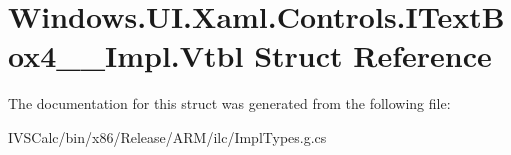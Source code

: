 \hypertarget{struct_windows_1_1_u_i_1_1_xaml_1_1_controls_1_1_i_text_box4_____impl_1_1_vtbl}{}\section{Windows.\+U\+I.\+Xaml.\+Controls.\+I\+Text\+Box4\+\_\+\+\_\+\+Impl.\+Vtbl Struct Reference}
\label{struct_windows_1_1_u_i_1_1_xaml_1_1_controls_1_1_i_text_box4_____impl_1_1_vtbl}


The documentation for this struct was generated from the following file\+:\begin{DoxyCompactItemize}
\item 
I\+V\+S\+Calc/bin/x86/\+Release/\+A\+R\+M/ilc/Impl\+Types.\+g.\+cs\end{DoxyCompactItemize}
